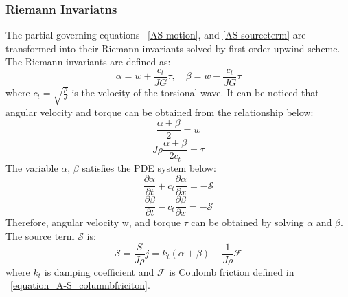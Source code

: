 \subsubsection{Riemann Invariatns}
The partial governing equations \equationname~\ref{AS-motion}, and \ref{AS-sourceterm} are transformed into their Riemann invariants solved by first order upwind scheme. The Riemann invariants are defined as:
\begin{equation}\label{AS-Riemann}
  \alpha = w + \frac{c_t}{JG}\tau, \quad \beta=w-\frac{c_t}{JG}\tau
\end{equation}
where $c_t = \sqrt{\frac{\rho}{J}}$ is the velocity of the torsional wave. It can be noticed that angular velocity and torque can be obtained from the relationship below: 
\begin{equation}\label{equation_Riemann_relation1}
  \frac{\alpha + \beta}{2} = w
\end{equation}
\begin{equation}\label{equation_Riemann_relation2}
  J \rho \frac{\alpha + \beta}{2c_t} = \tau
\end{equation}
The variable $\alpha$, $\beta$ satisfies the PDE system below: 
\begin{equation}\label{AS-Riemann_alpha}
  \frac{\partial \alpha}{\partial t} + c_t\frac{\partial \alpha}{\partial x} = -\mathcal{S}
\end{equation}
\begin{equation}\label{AS-Riemann_beta}
  \frac{\partial \beta}{\partial t} - c_t\frac{\partial \beta}{\partial x} = -\mathcal{S}
\end{equation}
Therefore, angular velocity w, and torque $\tau$ can be obtained by solving $\alpha$ and $\beta$.
The source term $\mathcal{S}$ is:
\begin{equation}\label{AS-source}
  \mathcal{S} = \frac{S}{J \rho} j= k_t(\alpha + \beta) + \frac{1}{J \rho} \mathcal{F}
\end{equation}
where $k_t$ is damping coefficient and $\mathcal{F}$ is Coulomb friction defined in \equationname~\ref{equation_A-S_columnbfriciton}. 
